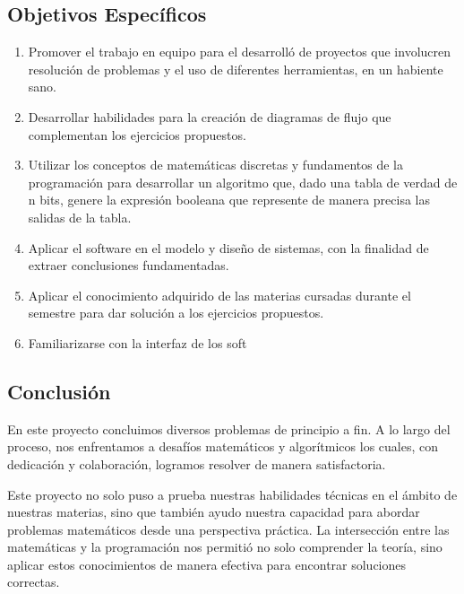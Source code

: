 \documentclass[conference]{IEEEtran}
\begin{document}
\subsection{Objetivos Específicos}
\begin{enumerate}
    \item Promover el trabajo en equipo para el desarrolló de proyectos que involucren resolución de problemas y el uso de diferentes herramientas,  en un habiente sano.
    \item Desarrollar habilidades para la creación de diagramas de flujo que complementan los ejercicios  propuestos.
    \item Utilizar los conceptos de matemáticas discretas y fundamentos de la programación para desarrollar un algoritmo que, dado una tabla de verdad de n bits, genere la expresión booleana que represente de manera precisa las salidas de la tabla.
    \item Aplicar el software en el modelo y diseño de sistemas, con la finalidad de extraer conclusiones fundamentadas. 
    \item Aplicar el conocimiento adquirido de las materias cursadas durante el semestre para dar solución a los ejercicios propuestos.
    \item Familiarizarse con la interfaz de los soft
\end{enumerate}














\subsection{Conclusión}

En este proyecto concluimos diversos problemas  de principio a fin.  A lo largo del proceso, nos enfrentamos a desafíos matemáticos y algorítmicos los cuales, con dedicación y colaboración, logramos resolver de manera satisfactoria.

Este proyecto no solo puso a prueba nuestras habilidades técnicas en el ámbito de nuestras materias, sino que también ayudo nuestra capacidad para abordar problemas matemáticos desde una perspectiva práctica. La intersección entre las matemáticas y la programación nos permitió no solo comprender la teoría, sino aplicar estos conocimientos de manera efectiva para encontrar soluciones correctas.
\end{document}
